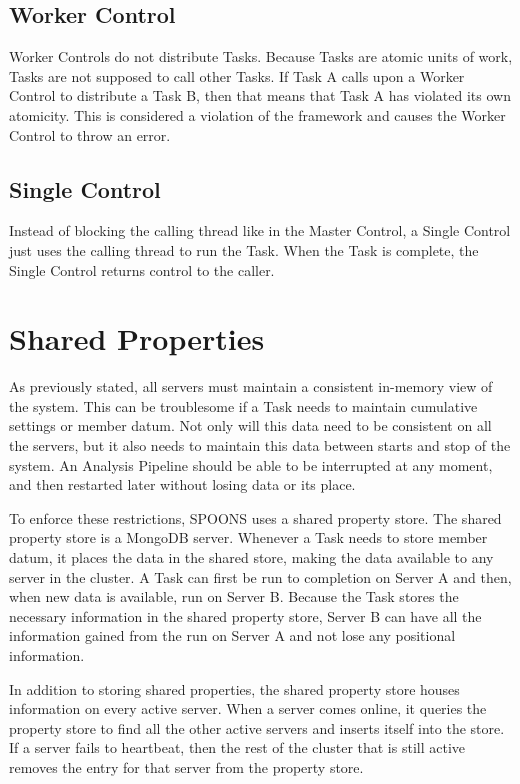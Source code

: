 \documentclass[12pt]{ucthesis}
\begin{document}
\subsection{Worker Control}
Worker Controls do not distribute Tasks.
Because Tasks are atomic units of work, Tasks are not supposed to call other Tasks.
If Task A calls upon a Worker Control to distribute a Task B, then that means that Task A has violated
its own atomicity. This is considered a violation of the framework and causes the Worker Control to throw an error.

\subsection{Single Control}
Instead of blocking the calling thread like in the Master Control, a Single Control
just uses the calling thread to run the Task. When the Task is complete,
the Single Control returns control to the caller.

\section{Shared Properties}
\label{arch-props}
As previously stated, all servers must maintain a consistent in-memory view of the system.
This can be troublesome if a Task needs to maintain cumulative settings or member datum.
Not only will this data need to be consistent on all the servers, but it also needs to maintain this
data between starts and stop of the system.
An Analysis Pipeline should be able to be interrupted at any moment, and then restarted later without losing data or its place.

To enforce these restrictions, SPOONS uses a shared property store. The shared property store is a MongoDB server.
Whenever a Task needs to store member datum, it places the data in the shared store, making the data available to any server in the cluster.
A Task can first be run to completion on Server A and then, when new data is available, run on Server B.
Because the Task stores the necessary information in the shared property store,
Server B can have all the information gained from the run on Server A and not lose any positional information.

In addition to storing shared properties, the shared property store houses information on every active server.
When a server comes online, it queries the property store to find all the other active servers and inserts itself into
the store. If a server fails to heartbeat, then the rest of the cluster that is still active removes the entry for that server from the property store.
\end{document}
